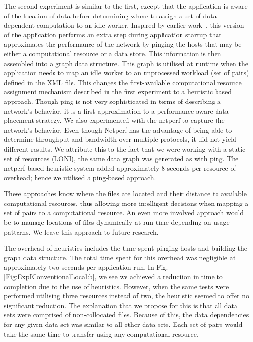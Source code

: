 \documentclass{rspublic}
\begin{document}
The second experiment is similar to the first, except that the
application is aware of the location of data before determining where
to assign a set of data-dependent computation to an idle worker.
Inspired by earlier work~\citep{netperf}, this version of the
application performs an extra step during application startup that
approximates the performance of the network by pinging the hosts that
may be either a computational resource or a data store. This
information is then assembled into a graph data structure. This graph
is utilised at runtime when the application needs to map an idle
worker to an unprocessed workload (set of pairs) defined in the XML
file. This changes the first-available computational resource
assignment mechanism described in the first experiment to a heuristic
based approach. Though ping is not very sophisticated in terms of
describing a network's behavior, it is a first-approximation to a
performance aware data-placement strategy. We also experimented with
the netperf \citep{netperf_web} to capture the network's behavior.
Even though Netperf has the advantage of being able to determine
throughput and bandwidth over multiple protocols, it did not yield
different results. We attribute this to the fact that we were working
with a static set of resources (LONI), the same data graph was
generated as with ping. The netperf-based heuristic system added
approximately 8 seconds per resource of overhead; hence we utilised a
ping-based approach.

These approaches know where the files are located and their distance
to available computational resources, thus allowing more intelligent
decisions when mapping a set of pairs to a computational resource. An
even more involved approach would be to manage locations of files
dynamically at run-time depending on usage patterns. We leave this
approach to future research.

The overhead of heuristics includes the time spent pinging hosts and
building the graph data structure. The total time spent for this
overhead was negligible at approximately two seconds per application
run. In Fig. \ref{Fig:ExpIConventionalLocal:b}, we see we achieved a
reduction in time to completion due to the use of heuristics. However,
when the same tests were performed utilising three resources instead of
two, the heuristic seemed to offer no significant reduction. The
explanation that we propose for this is that all data sets were
comprised of non-collocated files. Because of this, the data
dependencies for any given data set was similar to all other data sets.
Each set of pairs would take the same time to transfer using any
computational resource.
\end{document}
